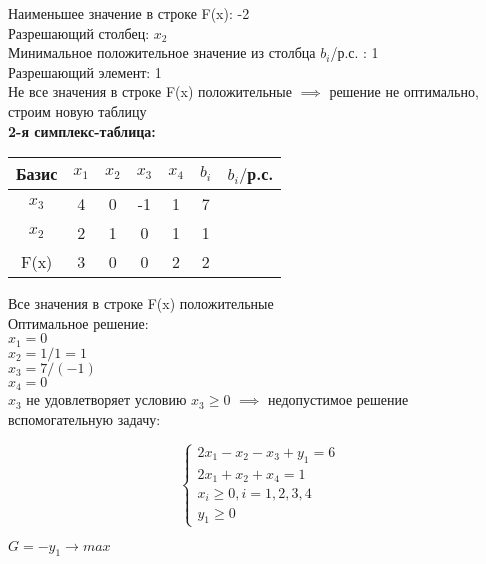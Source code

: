 \begin{flushleft}
    Наименьшее значение в строке F(x): -2\\
    Разрешающий столбец: $x_2$\\
    Минимальное положительное значение из столбца $b_i$/р.с. : 1\\
    Разрешающий элемент: 1\\
    Не все значения в строке F(x) положительные $\implies$ решение не оптимально, строим новую таблицу\\
    {\bf2-я симплекс-таблица:}\\
\end{flushleft}

\begin{center}
    \begin{tabular}{|c | c c c c c c|} 
         \hline
            Базис & $x_1$ & $x_2$ & $x_3$ & $x_4$ & $b_i$ & $b_i/$р.с.\\
         \hline
            $x_3$ & 4 & 0 & -1 & 1 & 7 &\\
         \hline
            $x_2$ & 2 & 1 & 0 & 1 & 1 & \\
         \hline
            F(x) & 3 & 0 & 0 & 2 & 2 &\\
         \hline
    \end{tabular}
\end{center}

\begin{flushleft}
    Все значения в строке F(x) положительные\\
    Оптимальное решение:\\
    $x_1 = 0$\\
    $x_2 = 1/1 = 1$\\
    $x_3 = 7/(-1)$\\
    $x_4 = 0$\\
    $x_3$ не удовлетворяет условию $x_3 \ge 0$ $\implies$ недопустимое решение\\
    { вспомогательную задачу:}\\
\end{flushleft}

\begin{equation*}
    \begin{cases}
        2x_1 - x_2 - x_3 + y_1= 6 \\
        2x_1 + x_2 + x_4 = 1 \\
        x_i \ge 0, i = 1, 2, 3, 4\\
        y_1 \ge 0
    \end{cases}
\end{equation*}
\begin{center}
    $G = - y_1 \rightarrow max$
\end{center}


